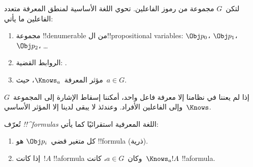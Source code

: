 \documentclass[../../../include/open-logic-section]{subfiles}
\begin{document}


\begin{defn}
لتكن~$G$ مجموعة من رموز الفاعلين. تحوي اللغة الأساسية لمنطق المعرفة متعدد
الفاعلين ما يأتي:
\begin{enumerate}
  \item مجموعة !!{denumerable} من ال!!{propositional variable}s:
    $\Obj p_0$، $\Obj p_1$، $\Obj p_2$، \dots
  \item الروابط القضية: \startycommalist
  .
  \item مؤثر المعرفة~$\Knows_a$، حيث~$a \in G$.
\end{enumerate}
\end{defn}

إذا لم يعننا في نظامنا إلا معرفة فاعل واحد، أمكننا إسقاط الإشارة إلى
المجموعة~$G$ وإلى الفاعلين الأفراد. وعندئذ لا يبقى لدينا إلا المؤثر
الأساسي~$\Knows$.

\begin{defn}
تُعرّف \emph{!!^{formula}s} اللغة المعرفية استقرائيًا كما يأتي:
\begin{enumerate}


\item كل متغير قضي~$\Obj p_i$ هو !!{formula} (ذرية).






\item إذا كانت~$!A$ !!a{formula} وكان~$a \in G$، كانت~$\Knows_a !A$
  !!a{formula}.

\end{enumerate}
\end{defn}
\end{document}
